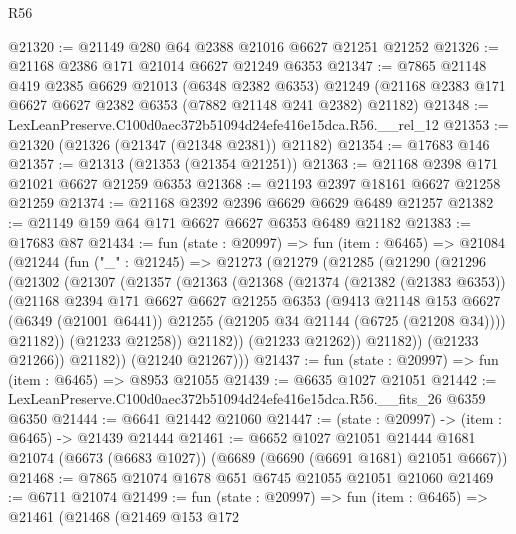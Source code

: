\begin{lexlean}{R56}
\begin{coremodule}
@21320 := @21149 @280 @64 @2388 @21016 @6627 @21251 @21252
@21326 := @21168 @2386 @171 @21014 @6627 @21249 @6353
@21347 := @7865
    @21148
    @419
    @2385
    @6629
    @21013
    (@6348 @2382 @6353)
    @21249
    (@21168 @2383 @171 @6627 @6627 @2382 @6353 (@7882 @21148 @241 @2382) @21182)
@21348 := LexLeanPreserve.C100d0aec372b51094d24efe416e15dca.R56.__rel_12
@21353 := @21320 (@21326 (@21347 (@21348 @2381)) @21182)
@21354 := @17683 @146
@21357 := @21313 (@21353 (@21354 @21251))
@21363 := @21168 @2398 @171 @21021 @6627 @21259 @6353
@21368 := @21193 @2397 @18161 @6627 @21258 @21259
@21374 := @21168 @2392 @2396 @6629 @6629 @6489 @21257
@21382 := @21149 @159 @64 @171 @6627 @6627 @6353 @6489 @21182
@21383 := @17683 @87
@21434 := fun (state : @20997) =>
  fun (item : @6465) =>
  @21084
    (@21244
      (fun ("_" : @21245) =>
      @21273
        (@21279
          (@21285
            (@21290
              (@21296
                (@21302
                  (@21307
                    (@21357
                      (@21363
                        (@21368
                          (@21374
                            (@21382 (@21383 @6353))
                            (@21168
                              @2394
                              @171
                              @6627
                              @6627
                              @21255
                              @6353
                              (@9413
                                @21148
                                @153
                                @6627
                                (@6349 (@21001 @6441))
                                @21255
                                (@21205 @34 @21144 (@6725 (@21208 @34))))
                              @21182))
                          (@21233 @21258))
                        @21182))
                    (@21233 @21262))
                  @21182))
              (@21233 @21266))
            @21182))
        (@21240 @21267)))
@21437 := fun (state : @20997) => fun (item : @6465) => @8953 @21055
@21439 := @6635 @1027 @21051
@21442 := LexLeanPreserve.C100d0aec372b51094d24efe416e15dca.R56.__fits_26 @6359 @6350
@21444 := @6641 @21442 @21060
@21447 := (state : @20997) -> (item : @6465) -> @21439 @21444
@21461 := @6652
    @1027
    @21051
    @21444
    @1681
    @21074
    (@6673 (@6683 @1027))
    (@6689 (@6690 (@6691 @1681) @21051 @6667))
@21468 := @7865 @21074 @1678 @651 @6745 @21055 @21051 @21060
@21469 := @6711 @21074
@21499 := fun (state : @20997) =>
  fun (item : @6465) =>
  @21461
    (@21468
      (@21469
        @153
        @172

\end{coremodule}
\end{lexlean}
